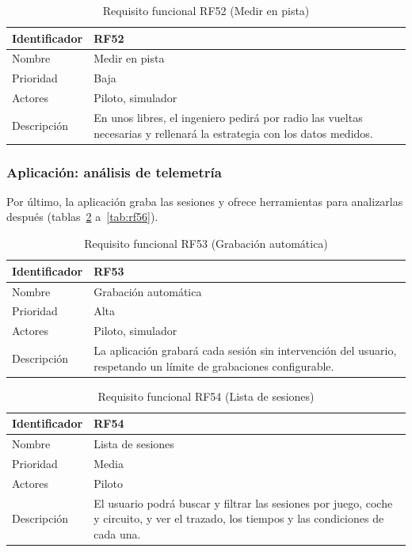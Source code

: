 \begin{table}[H]
	\centering
	\renewcommand{\arraystretch}{2}
	\begin{tabular}{|l|p{10cm}|}
		\hline
		Identificador & RF52 \\
		\hline
		Nombre & Medir en pista \\
		\hline
		Prioridad & Baja \\
		\hline
		Actores & Piloto, simulador \\
		\hline
		Descripción & En unos libres, el ingeniero pedirá por radio las vueltas necesarias y rellenará la estrategia con los datos medidos. \\
		\hline
	\end{tabular}
	\caption{Requisito funcional RF52 (Medir en pista)}
	\label{tab:rf52}
\end{table}

\subsubsection{Aplicación: análisis de telemetría}

Por último, la aplicación graba las sesiones y ofrece herramientas para analizarlas después (tablas~\ref{tab:rf53} a~\ref{tab:rf56}).

\begin{table}[H]
	\centering
	\renewcommand{\arraystretch}{2}
	\begin{tabular}{|l|p{10cm}|}
		\hline
		Identificador & RF53 \\
		\hline
		Nombre & Grabación automática \\
		\hline
		Prioridad & Alta \\
		\hline
		Actores & Piloto, simulador \\
		\hline
		Descripción & La aplicación grabará cada sesión sin intervención del usuario, respetando un límite de grabaciones configurable. \\
		\hline
	\end{tabular}
	\caption{Requisito funcional RF53 (Grabación automática)}
	\label{tab:rf53}
\end{table}

\begin{table}[H]
	\centering
	\renewcommand{\arraystretch}{2}
	\begin{tabular}{|l|p{10cm}|}
		\hline
		Identificador & RF54 \\
		\hline
		Nombre & Lista de sesiones \\
		\hline
		Prioridad & Media \\
		\hline
		Actores & Piloto \\
		\hline
		Descripción & El usuario podrá buscar y filtrar las sesiones por juego, coche y circuito, y ver el trazado, los tiempos y las condiciones de cada una. \\
		\hline
	\end{tabular}
	\caption{Requisito funcional RF54 (Lista de sesiones)}
	\label{tab:rf54}
\end{table}


